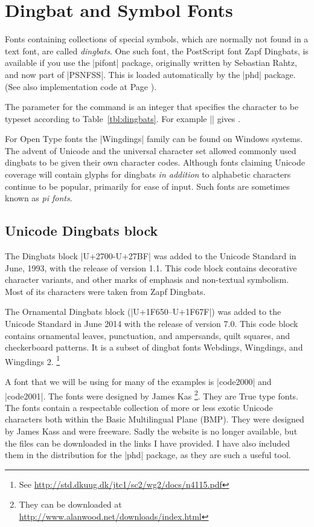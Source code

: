 \section{Dingbat and Symbol Fonts}


Fonts containing collections of special symbols, which are normally not found in a text font, are called  \textit{dingbats}. One such font, the PostScript font Zapf Dingbats, is available if you use the |pifont| package, originally written by Sebastian Rahtz, and now part of |PSNFSS|. This is loaded automatically by the |phd| package. (See also implementation code at Page \pageref{dingbats}).

The parameter for the  command is an integer that specifies the character to be typeset according to Table~\ref{tbl:dingbats}. For example || gives .

For Open Type fonts the |Wingdings| family can be found on Windows systems. The advent of Unicode and the universal character set allowed commonly used dingbats to be given their own character codes. Although fonts claiming Unicode coverage will contain glyphs for dingbats \textit{in addition} to alphabetic characters continue to be popular, primarily for ease of input. Such fonts are sometimes known as \textit{pi fonts}.

\subsection{Unicode Dingbats block}

The Dingbats block |U+2700-U+27BF| was added to the Unicode Standard in June, 1993, with the release of version 1.1. This code block  contains decorative character variants, and other marks of emphasis and non-textual symbolism. Most of its characters were taken from Zapf Dingbats. 

The Ornamental Dingbats block (|U+1F650–U+1F67F|) was added to the Unicode Standard in June 2014 with the release of version 7.0. This code block contains ornamental leaves, punctuation, and ampersands, quilt squares, and checkerboard patterns. It is a subset of dingbat fonts Webdings, Wingdings, and Wingdings 2. \footnote{See \url{http://std.dkuug.dk/jtc1/sc2/wg2/docs/n4115.pdf}}

A font that we will be using for many of the \XeLaTeX examples is |code2000|
and |code2001|. The fonts were designed by James Kas
\footnote{They can be downloaded at \url{http://www.alanwood.net/downloads/index.html}}. They are True type fonts. The fonts contain a respectable collection of more or less exotic Unicode characters both within the Basic Multilingual Plane (BMP). They were designed by James Kass and were freeware. Sadly the website is no longer available, but the files can be downloaded in the links I have provided. I have also included them in the distribution for the |phd| package, as they are such a useful tool.

